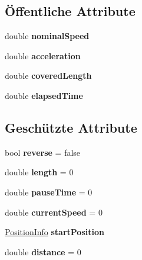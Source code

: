 \subsection*{Öffentliche Attribute}
\begin{DoxyCompactItemize}
\item 
\hypertarget{class_robot_ctrl_1_1_track_a7d996b14578c6059e6868e2210e1d582}{
double {\bfseries nominalSpeed}}
\label{class_robot_ctrl_1_1_track_a7d996b14578c6059e6868e2210e1d582}

\item 
\hypertarget{class_robot_ctrl_1_1_track_abf40e28208ac9861b7f75042fcb68d20}{
double {\bfseries acceleration}}
\label{class_robot_ctrl_1_1_track_abf40e28208ac9861b7f75042fcb68d20}

\item 
\hypertarget{class_robot_ctrl_1_1_track_a590aa4c79e81feedcc5116a874d88e4d}{
double {\bfseries coveredLength}}
\label{class_robot_ctrl_1_1_track_a590aa4c79e81feedcc5116a874d88e4d}

\item 
\hypertarget{class_robot_ctrl_1_1_track_a17436774d1af50ddffc88f505728f713}{
double {\bfseries elapsedTime}}
\label{class_robot_ctrl_1_1_track_a17436774d1af50ddffc88f505728f713}

\end{DoxyCompactItemize}
\subsection*{Geschützte Attribute}
\begin{DoxyCompactItemize}
\item 
\hypertarget{class_robot_ctrl_1_1_track_a98f9e9a8f087b8c7770d8f8320d821c5}{
bool {\bfseries reverse} = false}
\label{class_robot_ctrl_1_1_track_a98f9e9a8f087b8c7770d8f8320d821c5}

\item 
\hypertarget{class_robot_ctrl_1_1_track_ad4fd8df6c4813180fe764d327a9a9af8}{
double {\bfseries length} = 0}
\label{class_robot_ctrl_1_1_track_ad4fd8df6c4813180fe764d327a9a9af8}

\item 
\hypertarget{class_robot_ctrl_1_1_track_a98771bf28c921adf67e6df981dcf8e2a}{
double {\bfseries pauseTime} = 0}
\label{class_robot_ctrl_1_1_track_a98771bf28c921adf67e6df981dcf8e2a}

\item 
\hypertarget{class_robot_ctrl_1_1_track_ac8722c422d19d4b18430b106275bc9f9}{
double {\bfseries currentSpeed} = 0}
\label{class_robot_ctrl_1_1_track_ac8722c422d19d4b18430b106275bc9f9}

\item 
\hypertarget{class_robot_ctrl_1_1_track_a731b5abc7baa77c51b72c5dea7cbfba8}{
\hyperlink{struct_robot_ctrl_1_1_position_info}{PositionInfo} {\bfseries startPosition}}
\label{class_robot_ctrl_1_1_track_a731b5abc7baa77c51b72c5dea7cbfba8}

\item 
\hypertarget{class_robot_ctrl_1_1_track_aea67643a40f2cce540482512d219dcce}{
double {\bfseries distance} = 0}
\label{class_robot_ctrl_1_1_track_aea67643a40f2cce540482512d219dcce}

\end{DoxyCompactItemize}
